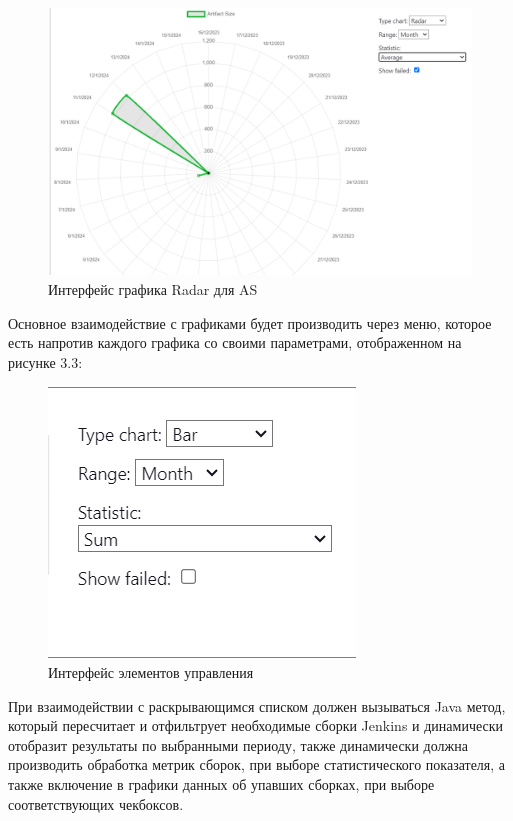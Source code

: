 \begin{figure}[ht!] 
	\center
	\includegraphics [scale=0.47] {my_folder/images//ui22}
	\caption{Интерфейс графика Radar для AS} 
	\label{fig:ui22}  
\end{figure}

Основное взаимодействие с графиками будет производить через меню, которое есть напротив каждого графика со своими параметрами, отображенном на рисунке 3.3:

\begin{figure}[ht!] 
	\center
	\includegraphics [scale=0.47] {my_folder/images//ui13}
	\caption{Интерфейс элементов управления} 
	\label{fig:ui13}  
\end{figure}

При взаимодействии с раскрывающимся списком должен вызываться Java метод, который пересчитает и отфильтрует необходимые сборки Jenkins и динамически отобразит результаты по выбранными периоду, также динамически должна производить обработка метрик сборок, при выборе статистического показателя, а также включение в графики данных об упавших сборках, при выборе соответствующих чекбоксов.

